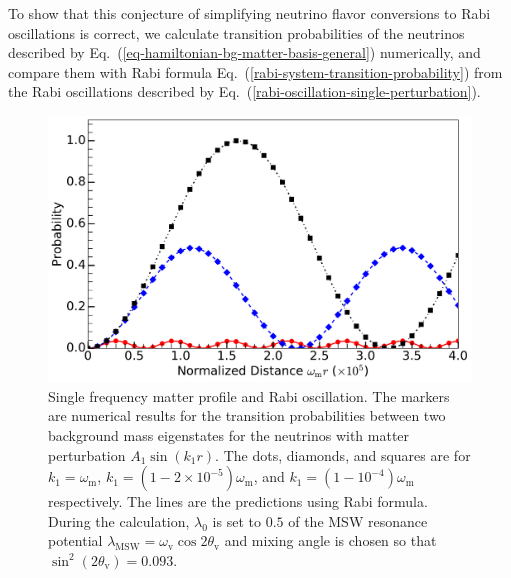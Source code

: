 \documentclass[%
reprint,
 amsmath,amssymb,
 prd,
]{revtex4-1}
\begin{document}

To show that this conjecture of simplifying neutrino flavor conversions to Rabi oscillations is correct, we calculate transition probabilities of the neutrinos described by Eq.~(\ref{eq-hamiltonian-bg-matter-basis-general}) numerically, and compare them with Rabi formula Eq.~(\ref{rabi-system-transition-probability}) from the Rabi oscillations described by Eq.~(\ref{rabi-oscillation-single-perturbation}). 




\begin{figure}
                \includegraphics[width=\columnwidth]{assets/rabiOscillationsNeutrinoCoincidence-single-frequency}
                \caption{Single frequency matter profile and Rabi oscillation. The markers are numerical results for the transition probabilities between two background mass eigenstates for the neutrinos with matter perturbation $A_1\sin(k_1 r)$. The dots, diamonds, and squares are for $k_1=\omega_{\mathrm m}$, $k_1=(1-2\times 10^{-5})\omega_{\mathrm m}$, and $k_1=(1-10^{-4})\omega_{\mathrm m}$ respectively. The lines are the predictions using Rabi formula. During the calculation, $\lambda_0$ is set to $0.5$ of the MSW resonance potential $\lambda_{\mathrm{MSW}}=\omega_{\mathrm{v}}\cos 2\theta_{\mathrm v}$ and mixing angle is chosen so that $\sin^2(2\theta_{\mathrm v}) = 0.093$.}
                \label{fig-rabiOscillationsNeutrinoCoincidence}
\end{figure}
\end{document}
